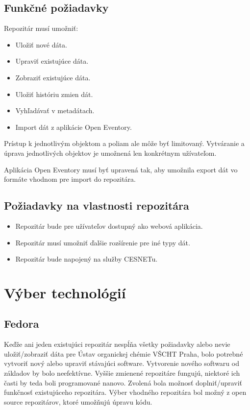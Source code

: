 \documentclass[thesis=M,slovak]{FITthesis}[2013/05/06]
\begin{document}
\subsection{Funkčné požiadavky}
Repozitár musí umožniť:
\begin{itemize}
	\item Uložiť nové dáta.
	\item Upraviť existujúce dáta.
	\item Zobraziť existujúce dáta.
	\item Uložiť históriu zmien dát.
	\item Vyhľadávať v metadátach.
	\item Import dát z aplikácie Open Eventory.
\end{itemize}

Prístup k jednotlivým objektom a poliam ale môže byť limitovaný. Vytváranie a úprava jednotlivých objektov je umožnená len konkrétnym užívateľom.

Aplikácia Open Eventory musí byť upravená tak, aby umožnila export dát vo formáte vhodnom pre import do repozitára.

\subsection{Požiadavky na vlastnosti repozitára}
\begin{itemize}
	\item Repozitár bude pre užívateľov dostupný ako webová aplikácia.
	\item Repozitár musí umožniť ďalšie rozšírenie pre iné typy dát.
	\item Repozitár bude napojený na služby CESNETu.
\end{itemize}

\section{Výber technológií}
\subsection{Fedora}
Keďže ani jeden existujúci repozitár nespĺňa všetky požiadavky alebo nevie uložiť/zobraziť dáta pre Ústav organickej chémie VŠCHT Praha, bolo potrebné vytvoriť nový alebo upraviť stávajúci software. Vytvorenie nového softwaru od základov by bolo neefektívne. Vyššie zmienené repozitáre fungujú, niektoré ich časti by teda boli programované nanovo. Zvolená bola možnosť doplniť/upraviť funkčnosť existujúceho repozitára. Výber vhodného repozitára bol možný z open source repozitárov, ktoré umožňujú úpravu kódu.
\end{document}
